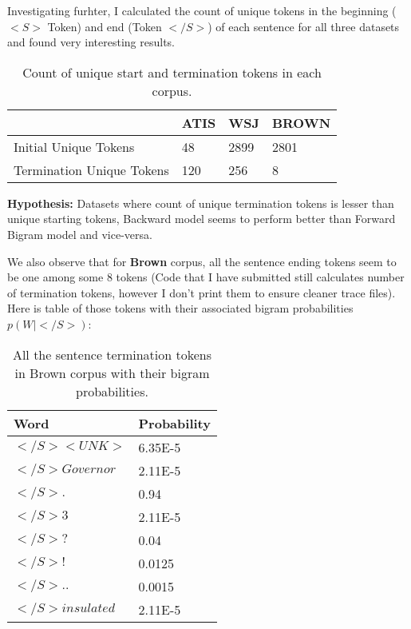 Investigating furhter, I calculated the count of unique tokens in the beginning ($<S>$ Token) and end (Token $</S>$) of each sentence for all three datasets and found very interesting results.

\begin{center}	
    \begin{table}[ht]
    \centering
    \begin{tabular}{| l | l | l | l |}
    \hline
     & ATIS &  WSJ & BROWN \\ \hline
     Initial Unique Tokens &  48 & 2899 & 2801 \\ \hline
     Termination Unique Tokens & 120 & 256 & 8 \\ \hline
    \end{tabular}
    \caption{Count of unique start and termination tokens in each corpus.}
    \end{table}%
\end{center}

{\bfseries Hypothesis:} Datasets where count of unique termination tokens is lesser than unique starting tokens, Backward model seems to perform better than Forward Bigram model and vice-versa.

We also observe that for {\bfseries Brown} corpus, all the sentence ending tokens seem to be one among some 8 tokens (Code that I have submitted still calculates number of termination tokens, however I don't print them to ensure cleaner trace files). Here is table of those tokens with their associated bigram probabilities $p(W|</S>)$:

\begin{center}	
    \begin{table}[ht]
    \centering
    \begin{tabular}{| l | l | }
    \hline
    Word & Probability \\ \hline
   $</S><UNK>$ & 6.35E-5\\ \hline
   $</S>Governor$ & 2.11E-5 \\ \hline
   $</S>.$ & 0.94 \\ \hline
   $</S>3$ & 2.11E-5  \\ \hline
   $</S>?$ & 0.04  \\ \hline 
   $</S>!$ & 0.0125  \\ \hline 
   $</S>..$ & 0.0015  \\ \hline 
   $</S>insulated$ & 2.11E-5  \\ \hline 
    \end{tabular}
    \caption{All the sentence termination tokens in Brown corpus with their bigram probabilities.}
    \end{table}%
\end{center}

